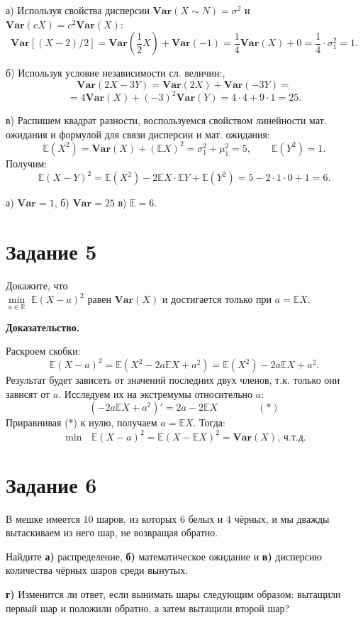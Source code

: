 \documentclass[a4paper,12pt]{article}
\newcommand{\ssolve}{\par\vspace{5pt}\noindent{\bf Решение. }\par}
\newcommand{\aanswer}{\par\vspace{5pt}\noindent{\bf Ответ. }}
\begin{document}
\ssolve \par
а) Используя свойства дисперсии $\textbf{Var}(X \sim N) = \sigma^2$ и \\ $\textbf{Var} (cX) = c^2 \textbf{Var}(X)$:
$$ \textbf{Var}[(X-2)/2]=\textbf{Var}(\frac{1}{2}X)+\textbf{Var}(-1)=\frac{1}{4}\textbf{Var}(X)+0=\frac{1}{4}\cdot \sigma_1^2 = 1.$$ \par
б) Используя условие независимости сл. величин:,
$$\textbf{Var}(2X-3Y)=\textbf{Var}(2X)+\textbf{Var}(-3Y)=$$
$$=4\textbf{Var}(X)+(-3)^2\textbf{Var}(Y)=4\cdot 4 + 9 \cdot 1 = 25.$$ 
\par
в) Распишем квадрат разности, воспользуемся свойством линейности мат. ожидания и формулой для связи дисперсии и мат. ожидания:
$$\mathbb{E}(X^2)=\textbf{Var}(X)+(\mathbb{E}X)^2=\sigma_1^2+\mu_1^2=5, \qquad \mathbb{E}(Y^2)=1.$$
Получим:
$$\mathbb{E}(X - Y )^2=\mathbb{E}(X^2)-2\mathbb{E}X\cdot\mathbb{E}Y+\mathbb{E}(Y^2)=5-2\cdot1\cdot0+1=6.$$
\aanswer а) $\textbf{Var} = 1$, б) $\textbf{Var} = 25$ в) $\mathbb{E} = 6$.

\section*{Задание 5}
Докажите, что \\ $\underset{a \in \mathbb{R}}{\min}$ $\mathbb{E}(X-a)^2$ равен $\textbf{Var}(X)$ и достигается только при $a = \mathbb{E}X$.
\par \vspace{5pt}
\textbf{Доказательство.} \par
Раскроем скобки:
$$\mathbb{E}(X-a)^2 = \mathbb{E}(X^2-2a\mathbb{E}X+a^2)=\mathbb{E}(X^2)-2a\mathbb{E}X+a^2.$$
Результат будет зависеть от значений последних двух членов, т.к. только они зависят от $a$. Исследуем их на экстремумы относительно $a$:
$$(-2a\mathbb{E}X+a^2)'=2a-2\mathbb{E}X \qquad \qquad (*)$$
Приравнивая (*) к нулю, получаем $a = \mathbb{E}X$. Тогда:
$${\min} \text{ } \mathbb{E}(X-a)^2 = \mathbb{E}(X-\mathbb{E}X)^2=\textbf{Var}(X) \text{, ч.т.д.}$$ 

\section*{Задание 6}
В мешке имеется $10$ шаров, из которых $6$ белых и $4$ чёрных, и мы дважды вытаскиваем из него шар, не возвращая обратно. \par
Найдите \textbf{а)} распределение, \textbf{б)} математическое ожидание и \textbf{в)} дисперсию количества чёрных шаров среди вынутых. \par
\textbf{г)} Изменится ли ответ, если вынимать шары следующим образом: вытащили первый
шар и положили обратно, а затем вытащили второй шар?
\end{document}
